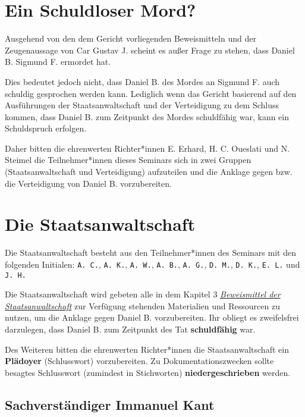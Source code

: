 \documentclass[
  a4paper,
]{report}
\begin{document}
\hypertarget{blameless}{%
\section{Ein Schuldloser Mord?}\label{blameless}}

Ausgehend von den dem Gericht vorliegenden Beweismitteln und der Zeugenaussage von Car Gustav J. scheint es außer Frage zu stehen, dass Daniel B. Sigmund F. ermordet hat.

Dies bedeutet jedoch nicht, dass Daniel B. des Mordes an Sigmund F. auch schuldig gesprochen werden kann. Lediglich wenn das Gericht basierend auf den Ausführungen der Staatsanwaltschaft und der Verteidigung zu dem Schluss kommen, dass Daniel B. zum Zeitpunkt des Mordes schuldfähig war, kann ein Schuldspruch erfolgen.

Daher bitten die ehrenwerten Richter*innen E. Erhard, H. C. Oueslati und N. Steimel die Teilnehmer*innen dieses Seminars sich in zwei Gruppen (Staatsanwaltschaft und Verteidigung) aufzuteilen und die Anklage gegen bzw. die Verteidigung von Daniel B. vorzubereiten.

\hypertarget{prosecution}{%
\section{Die Staatsanwaltschaft}\label{prosecution}}

Die Staatsanwaltschaft besteht aus den Teilnehmer*innen des Seminars mit den folgenden Initialen: \texttt{A.\ C.}, \texttt{A.\ K.}, \texttt{A.\ W.}, \texttt{A.\ B.}, \texttt{A.\ G.}, \texttt{D.\ M.}, \texttt{D.\ K.}, \texttt{E.\ L.} und \texttt{J.\ H.}

Die Staatsanwaltschaft wird gebeten alle in dem Kapitel 3 \protect\hyperlink{prosecution-evidence}{\emph{Beweismittel der Staatsanwaltschaft}} zur Verfügung stehenden Materialien und Ressourcen zu nutzen, um die Anklage gegen Daniel B. vorzubereiten. Ihr obliegt es zweifelsfrei darzulegen, dass Daniel B. zum Zeitpunkt des Tat \textbf{schuldfähig} war.

Des Weiteren bitten die ehrenwerten Richter*innen die Staatsanwaltschaft ein \textbf{Plädoyer} (Schlusswort) vorzubereiten. Zu Dokumentationszwecken sollte besagtes Schlusswort (zumindest in Stichworten) \textbf{niedergeschrieben} werden.

\hypertarget{sachverstuxe4ndiger-immanuel-kant}{%
\subsection{Sachverständiger Immanuel Kant}\label{sachverstuxe4ndiger-immanuel-kant}}
\end{document}
